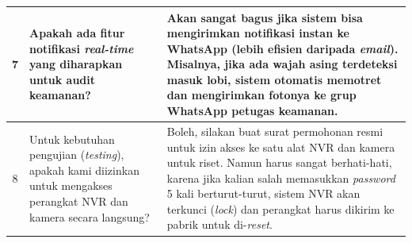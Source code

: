 \begin{longtable}{|c|p{}|p{}|}
7 & Apakah ada fitur notifikasi \textit{real-time} yang diharapkan untuk audit keamanan? & Akan sangat bagus jika sistem bisa mengirimkan notifikasi instan ke WhatsApp (lebih efisien daripada \textit{email}). Misalnya, jika ada wajah asing terdeteksi masuk lobi, sistem otomatis memotret dan mengirimkan fotonya ke grup WhatsApp petugas keamanan. \\ \hline
8 & Untuk kebutuhan pengujian (\textit{testing}), apakah kami diizinkan untuk mengakses perangkat NVR dan kamera secara langsung? & Boleh, silakan buat surat permohonan resmi untuk izin akses ke satu alat NVR dan kamera untuk riset. Namun harus sangat berhati-hati, karena jika kalian salah memasukkan \textit{password} 5 kali berturut-turut, sistem NVR akan terkunci (\textit{lock}) dan perangkat harus dikirim ke pabrik untuk di-\textit{reset}. \\ \hline
\end{longtable}
